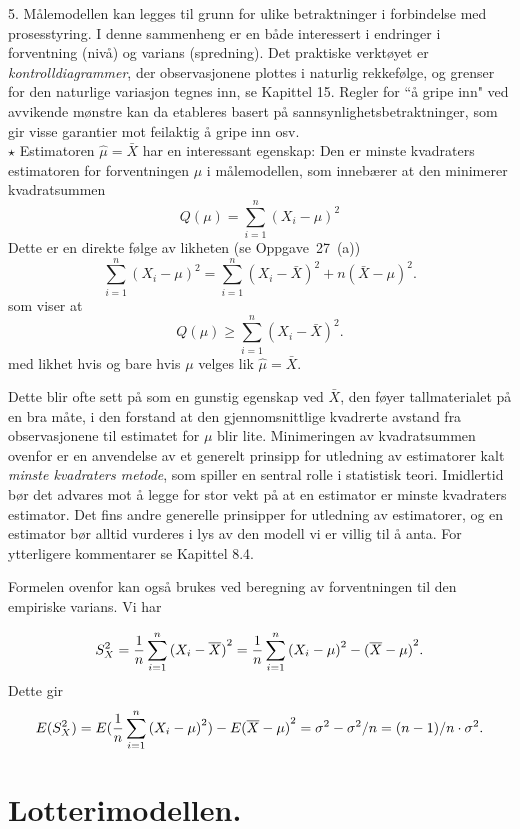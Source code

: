 5. Målemodellen kan legges til grunn for ulike betraktninger i forbindelse
med prosesstyring. I denne sammenheng er en både interessert i endringer i
forventning (nivå) og varians (spredning). Det praktiske verktøyet er
{\em kontrolldiagrammer}, der observasjonene plottes i naturlig rekkefølge,
og grenser for den naturlige variasjon tegnes inn, se Kapittel 15.
Regler for ``å gripe inn" ved avvikende mønstre kan da etableres
basert på sannsynlighetsbetraktninger, som gir visse garantier mot
feilaktig å gripe inn osv. \\[0.1cm]


 $\star$ \small  Estimatoren $\hat{\mu} = \bar X$ har en interessant egenskap:
Den er minste kvadraters estimatoren for forventningen $\mu$ i
målemodellen, som innebærer at den minimerer kvadratsummen
\[ Q(\mu )=\sum_{i=1}^n{(X_i-\mu)}^2 \]
Dette er en direkte følge av likheten (se Oppgave~27~(a))
\[  \sum_{i=1}^n{(X_i-\mu)}^2=
       \sum_{i=1}^n{(X_i-\bar X)}^2+n{(\bar X-\mu)}^2.\]
som viser at
\[  Q(\mu )\ge \sum_{i=1}^n{(X_i-\bar X)}^2.\]
med likhet hvis og bare hvis $\mu$ velges lik $\hat\mu=\bar X$.

Dette blir ofte sett på som en gunstig egenskap ved $\bar X$,
den føyer tallmaterialet på en bra måte, i den forstand
at den gjennomsnittlige kvad\-rerte avstand fra observasjonene til
estimatet for $\mu$ blir lite. Minimeringen av kvadratsummen
ovenfor er en anvendelse av et generelt prinsipp for utledning av
estimatorer kalt {\em minste kvadraters metode}, som spiller en
sentral rolle i statistisk teori. Imidlertid bør det advares
mot å legge for stor vekt på at en estimator er minste
kvadraters estimator. Det fins andre generelle prinsipper for
utledning av estimatorer, og en estimator bør alltid vurderes
i lys av den modell vi er villig til å anta. For ytterligere
kommentarer se Kapittel 8.4.

Formelen ovenfor kan også brukes ved beregning av
forventningen til den empiriske varians. Vi har

\[ S_X^2={1\over n}\sum_{i=1}^n {(X_i-\bar X)}^2= {1\over
               n}\sum_{i=1}^n {(X_i-\mu)}^2-{(\bar X-\mu)}^2.\]
Dette gir
\begin{eqnarray*}
  E(S_X^2)=E({1\over n}\sum_{i=1}^n {(X_i-\mu)}^2 )-
     E{(\bar {X}- \mu )}^2= \sigma ^2 - \sigma ^2/n=(n-1)/n \cdot
     \sigma ^2.
\end{eqnarray*}
\normalsize

\section{Lotterimodellen.}

